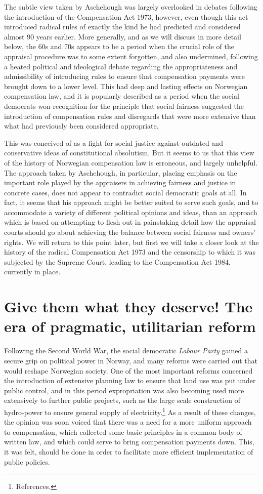 \documentclass[10pt]{article} %
\begin{document}
The subtle view taken by Aschehough was largely overlooked in debates following the introduction of the Compensation Act 1973, however, even though this act introduced radical rules of exactly the kind he had predicted and considered almost 90 years earlier. More generally, and as we will discuss in more detail below, the 60s and 70s appears to be a period when the crucial role of the appraisal procedure was to some extent forgotten, and also undermined, following a heated political and ideological debate regarding the appropriateness and admissibility of introducing rules to ensure that compensation payments were brought down to a lower level. This had deep and lasting effects on Norwegian compensation law, and it is popularly described as a period when the social democrats won recognition for the principle that social fairness suggested the introduction of compensation rules and disregards that were more extensive than what had previously been considered appropriate. 

This was conceived of as a fight for social justice against outdated and conservative ideas of constitutional absolutism. But it seems to us that this view of the history of Norwegian compensation law is erroneous, and largely unhelpful. The approach taken by Aschehough, in particular, placing emphasis on the important role played by the appraisers in achieving fairness and justice in concrete cases, does not appear to contradict social democratic goals at all. In fact, it seems that his approach might be better suited to serve such goals, and to accommodate a variety of different political opinions and ideas, than an approach which is based on attempting to flesh out in painstaking detail how the appraisal courts should go about achieving the balance between social fairness and owners' rights. We will return to this point later, but first we will take a closer look at the history of the radical Compensation Act 1973 and the censorship to which it was subjected by the Supreme Court, leading to the Compensation Act 1984, currently in place.

\section{Give them what they deserve! The era of pragmatic, utilitarian reform}\label{sec:pra}

Following the Second World War, the social democratic \emph{Labour Party} gained a secure grip on political power in Norway, and many reforms were carried out that would reshape Norwegian society. One of the most important reforms concerned the introduction of extensive planning law to ensure that land use was put under public control, and in this period expropriation was also becoming used more extensively to further public projects, such as the large scale construction of hydro-power to ensure general supply of electricity.\footnote{References.} As a result of these changes, the opinion was soon voiced that there was a need for a more uniform approach to compensation, which collected some basic principles in a common body of written law, and which could serve to bring compensation payments down. This, it was felt, should be done in order to facilitate more efficient implementation of public policies. 
\end{document}
